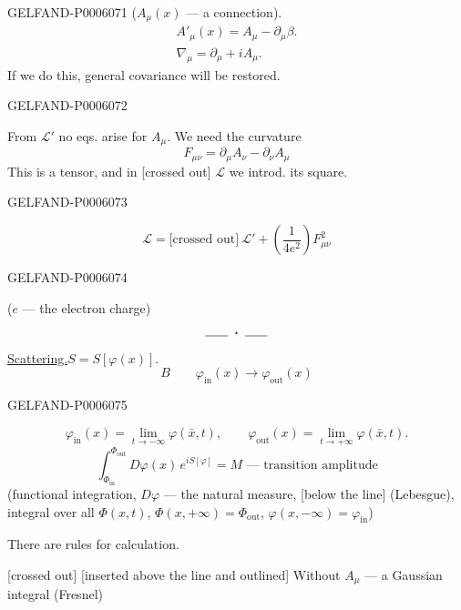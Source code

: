 \begin{GelfandAdjacentEvidence}{GELFAND-P000607}{1}
(\(A_\mu(x)\) — a connection).
\[
\begin{gathered}
A'_\mu(x)=A_\mu-\partial_\mu\beta.\\
\nabla_\mu=\partial_\mu+iA_\mu.
\end{gathered}
\]
If we do this, general covariance will be restored.
\end{GelfandAdjacentEvidence}
\begin{GelfandAdjacentEvidence}{GELFAND-P000607}{2}


From \(\mathcal L'\) no eqs. arise for \(A_\mu\). We need the curvature
\[
F_{\mu\nu}=\partial_\mu A_\nu-\partial_\nu A_\mu
\]
This is a tensor, and in [crossed out] \(\mathcal L\) we introd. its square.
\end{GelfandAdjacentEvidence}
\begin{GelfandAdjacentEvidence}{GELFAND-P000607}{3}

\[
\mathcal L=\text{[crossed out]}\ \mathcal L'+\left(\frac1{4e^2}\right)F_{\mu\nu}^2
\]
\end{GelfandAdjacentEvidence}
\begin{GelfandAdjacentEvidence}{GELFAND-P000607}{4}

(\(e\) — the electron charge)
\[
\rule{1.8em}{.4pt}\;\boldsymbol{\cdot}\;\rule{1.8em}{.4pt}
\]
\underline{Scattering.}\qquad \(S=S[\varphi(x)]\).
\[
B\qquad \varphi_{\mathrm{in}}(x)\longrightarrow\varphi_{\mathrm{out}}(x)
\]
\end{GelfandAdjacentEvidence}
\begin{GelfandAdjacentEvidence}{GELFAND-P000607}{5}

\[
\varphi_{\mathrm{in}}(x)=\lim_{t\to-\infty}\varphi(\bar x,t),\qquad
\varphi_{\mathrm{out}}(x)=\lim_{t\to+\infty}\varphi(\bar x,t).
\]
\[
\int_{\Phi_{\mathrm{in}}}^{\Phi_{\mathrm{out}}}D\varphi(x)\,e^{iS[\varphi]}
=M\text{ — transition amplitude}
\]
(functional integration, \(D\varphi\) — the natural measure, [below the line] (Lebesgue),
integral over all \(\Phi(x,t)\),
\(\Phi(x,+\infty)=\Phi_{\mathrm{out}}\),
\(\varphi(x,-\infty)=\varphi_{\mathrm{in}}\))

There are rules for calculation.

[crossed out] [inserted above the line and outlined] Without \(A_\mu\) — a Gaussian integral (Fresnel)
\end{GelfandAdjacentEvidence}
